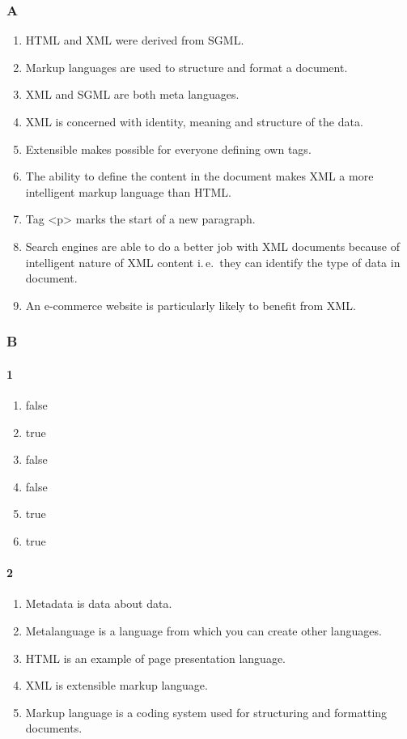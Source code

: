 \documentclass[a5paper,10pt,notitlepage,pdftex,headsepline]{scrartcl}
\begin{document}
    \subsubsection{A}
      \begin{enumerate}
        \item HTML and XML were derived from SGML.
        \item Markup languages are used to structure and format a document.
        \item XML and SGML are both meta languages.
        \item XML is concerned with identity, meaning and structure of the data.
        \item Extensible makes possible for everyone defining own tags.
        \item The ability to define the content in the document makes XML a more
          intelligent markup language than HTML.
        \item Tag <p> marks the start of a new paragraph.
        \item Search engines are able to do a better job with XML documents because
          of intelligent nature of XML content i.\,e.\  they can identify the type of
          data in document.
        \item An e-commerce website is particularly likely to benefit from XML.
      \end{enumerate}
    \subsubsection{B}
      \paragraph{1}
        \begin{enumerate}
          \item false
          \item true
          \item false
          \item false
          \item true
          \item true
        \end{enumerate}
      \paragraph{2}
        \begin{enumerate}
          \item Metadata is data about data.
          \item Metalanguage is a language from which you can create other
            languages.
          \item HTML is an example of page presentation language.
          \item XML is extensible markup language.
          \item Markup language is a coding system used for structuring and
            formatting documents.
        \end{enumerate}
\end{document}
